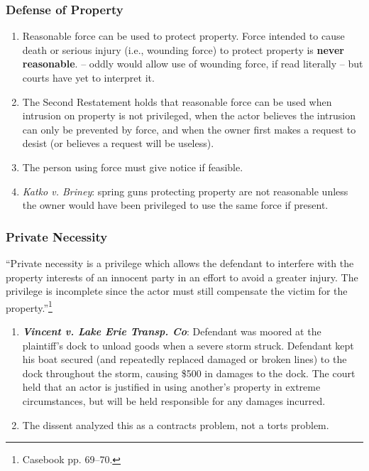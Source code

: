 
\subsubsection{Defense of Property}

\begin{enumerate}
    \item Reasonable force can be used to protect property. Force intended to 
    cause death or serious injury (i.e., wounding force) to protect property 
    is \textbf{never reasonable}. %
    -- oddly would allow use of wounding force, if read literally -- but 
    courts have yet to interpret it.
    \item The Second Restatement holds that reasonable force can be used when 
    intrusion on property is not privileged, when the actor believes the 
    intrusion can only be prevented by force, and when the owner first makes a 
    request to desist (or believes a request will be useless).
    \item The person using force must give notice if feasible.
    \item \emph{Katko v. Briney}: spring guns protecting property are not 
    reasonable unless the owner would have been privileged to use the same 
    force if present.
\end{enumerate}

\subsubsection{Private Necessity}



``Private necessity is a privilege which allows the defendant to interfere 
with the property interests of an innocent party in an effort to avoid a 
greater injury. The privilege is incomplete since the actor must still 
compensate the victim for the property.''\footnote{Casebook pp. 69--70.}

\begin{enumerate}
    \item \textbf{\emph{Vincent v. Lake Erie Transp. Co}}: Defendant was 
    moored at the plaintiff's dock to unload goods when a severe storm struck. 
    Defendant kept his boat secured (and repeatedly replaced damaged or broken 
    lines) to the dock throughout the storm, causing \$500 in damages to the 
    dock. The court held that an actor is justified in using another's 
    property in extreme circumstances, but will be held responsible for any 
    damages incurred.
    \item The dissent analyzed this as a contracts problem, not a torts 
    problem.
\end{enumerate}

